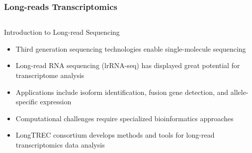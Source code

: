 \documentclass[aspectratio=169]{beamer}
\begin{document}
\begin{frame}
  \frametitle{Long-reads Transcriptomics}
  
  \begin{columns}[T]
    \begin{column}{\textwidth}
      {Introduction to Long-read Sequencing}
      \vspace{0.1cm}
      
      \begin{itemize}
        \item Third generation sequencing technologies enable single-molecule sequencing
        \item Long-read RNA sequencing (lrRNA-seq) has displayed great potential for transcriptome analysis
        \item Applications include isoform identification, fusion gene detection, and allele-specific expression
        \item Computational challenges require specialized bioinformatics approaches
        \item LongTREC consortium develops methods and tools for long-read transcriptomics data analysis
      \end{itemize}
    \end{column}
  \end{columns}
\end{frame}


\end{document}
